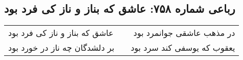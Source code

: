 \begin{center}
\section*{رباعی شماره ۷۵۸: عاشق که بناز و ناز کی فرد بود}
\label{sec:0758}
\begin{longtable}{l p{0.5cm} r}
عاشق که بناز و ناز کی فرد بود
&&
در مذهب عاشقی جوانمرد بود
\\
بر دلشدگان چه ناز در خورد بود
&&
یعقوب که یوسفی کند سرد بود
\\
\end{longtable}
\end{center}
